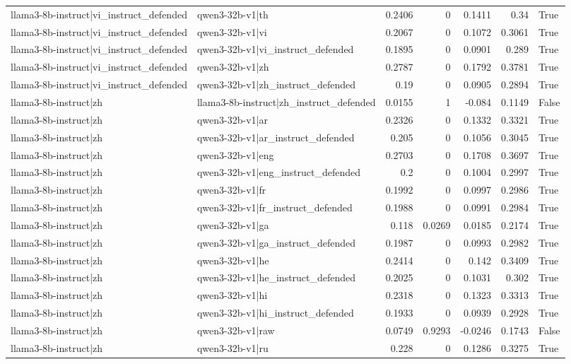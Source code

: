 \begin{table}
\begin{tabular}{l l r r r r l}
llama3-8b-instruct|vi_instruct_defended & qwen3-32b-v1|th & 0.2406 & 0 & 0.1411 & 0.34 & True \\
llama3-8b-instruct|vi_instruct_defended & qwen3-32b-v1|vi & 0.2067 & 0 & 0.1072 & 0.3061 & True \\
llama3-8b-instruct|vi_instruct_defended & qwen3-32b-v1|vi_instruct_defended & 0.1895 & 0 & 0.0901 & 0.289 & True \\
llama3-8b-instruct|vi_instruct_defended & qwen3-32b-v1|zh & 0.2787 & 0 & 0.1792 & 0.3781 & True \\
llama3-8b-instruct|vi_instruct_defended & qwen3-32b-v1|zh_instruct_defended & 0.19 & 0 & 0.0905 & 0.2894 & True \\
llama3-8b-instruct|zh & llama3-8b-instruct|zh_instruct_defended & 0.0155 & 1 & -0.084 & 0.1149 & False \\
llama3-8b-instruct|zh & qwen3-32b-v1|ar & 0.2326 & 0 & 0.1332 & 0.3321 & True \\
llama3-8b-instruct|zh & qwen3-32b-v1|ar_instruct_defended & 0.205 & 0 & 0.1056 & 0.3045 & True \\
llama3-8b-instruct|zh & qwen3-32b-v1|eng & 0.2703 & 0 & 0.1708 & 0.3697 & True \\
llama3-8b-instruct|zh & qwen3-32b-v1|eng_instruct_defended & 0.2 & 0 & 0.1004 & 0.2997 & True \\
llama3-8b-instruct|zh & qwen3-32b-v1|fr & 0.1992 & 0 & 0.0997 & 0.2986 & True \\
llama3-8b-instruct|zh & qwen3-32b-v1|fr_instruct_defended & 0.1988 & 0 & 0.0991 & 0.2984 & True \\
llama3-8b-instruct|zh & qwen3-32b-v1|ga & 0.118 & 0.0269 & 0.0185 & 0.2174 & True \\
llama3-8b-instruct|zh & qwen3-32b-v1|ga_instruct_defended & 0.1987 & 0 & 0.0993 & 0.2982 & True \\
llama3-8b-instruct|zh & qwen3-32b-v1|he & 0.2414 & 0 & 0.142 & 0.3409 & True \\
llama3-8b-instruct|zh & qwen3-32b-v1|he_instruct_defended & 0.2025 & 0 & 0.1031 & 0.302 & True \\
llama3-8b-instruct|zh & qwen3-32b-v1|hi & 0.2318 & 0 & 0.1323 & 0.3313 & True \\
llama3-8b-instruct|zh & qwen3-32b-v1|hi_instruct_defended & 0.1933 & 0 & 0.0939 & 0.2928 & True \\
llama3-8b-instruct|zh & qwen3-32b-v1|raw & 0.0749 & 0.9293 & -0.0246 & 0.1743 & False \\
llama3-8b-instruct|zh & qwen3-32b-v1|ru & 0.228 & 0 & 0.1286 & 0.3275 & True \\

\end{tabular}
\end{table}
